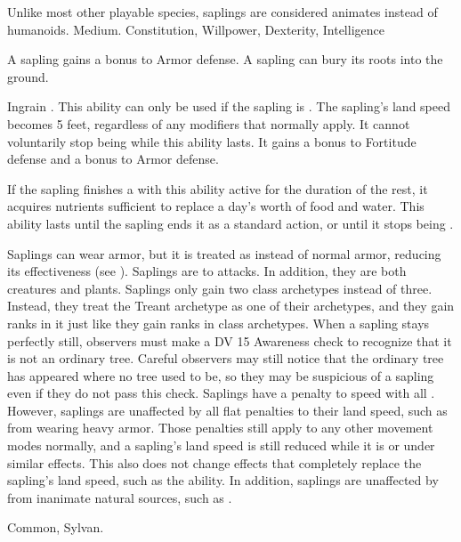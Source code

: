    Unlike most other playable species, saplings are considered animates instead of humanoids.
   Medium.
    Constitution,  Willpower,  Dexterity,  Intelligence
  \begin{itemize}
     A sapling gains a  bonus to Armor defense.
     A sapling can bury its roots into the ground.
      \begin{activeability}{Ingrain}
        \abilityusagetime {}.
        \rankline
        This ability can only be used if the sapling is .
        The sapling's land speed becomes 5 feet, regardless of any modifiers that normally apply.
        It cannot voluntarily stop being  while this ability lasts.
        It gains a  bonus to Fortitude defense and a  bonus to Armor defense.

        If the sapling finishes a  with this ability active for the duration of the rest, it acquires nutrients sufficient to replace a day's worth of food and water.
        This ability lasts until the sapling ends it as a standard action, or until it stops being .
      \end{activeability}
     Saplings can wear armor, but it is treated as  instead of normal armor, reducing its effectiveness (see ).
     Saplings are \vulnerable to \atFire attacks. In addition, they are both creatures and plants.
     Saplings only gain two class archetypes instead of three.
      Instead, they treat the Treant archetype as one of their archetypes, and they gain ranks in it just like they gain ranks in class archetypes.
     When a sapling stays perfectly still, observers must make a DV 15 Awareness check to recognize that it is not an ordinary tree.
      Careful observers may still notice that the ordinary tree has appeared where no tree used to be, so they may be suspicious of a sapling even if they do not pass this check.
     Saplings have a  penalty to speed with all .
      However, saplings are unaffected by all flat penalties to their land speed, such as from wearing heavy armor.
      Those penalties still apply to any other movement modes normally, and a sapling's land speed is still reduced while it is \slowed or under similar effects.
      This also does not change effects that completely replace the sapling's land speed, such as the  ability.
      In addition, saplings are unaffected by  from inanimate natural sources, such as .
  \end{itemize}
   Common, Sylvan.


